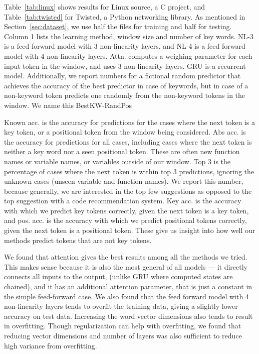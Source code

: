 \noindent
Table~\ref{tab:linux} shows results for Linux source, a C project, and
Table~\ref{tab:twisted} for Twisted, a Python networking library. As mentioned
in Section~\ref{sec:dataset}, we use half the files for training and half for
testing.
Column 1
lists the learning method, window size and number of key words.
NL-3 is a feed forward model with 3 non-linearity layers, and NL-4 is a feed
forward model with 4 non-linearity layers. Attn. computes a weighing
parameter for each input token in the window, and uses 3 non-linearity layers.
GRU is a recurrent model.
Additionally, we report numbers for a fictional random
predictor that achieves the accuracy of the best predictor in case of keywords,
but in case of a non-keyword token predicts one randomly from the non-keyword
tokens in the window. We name this BestKW-RandPos

Known acc. is the
accuracy for predictions for the cases where the next token is a key token, or
a positional token from the window being considered. Abs acc. is the accuracy
for predictions for all cases, including cases where the next token is
neither a key word nor a seen positional token. These are often new function
names or variable names, or variables outside of our window. Top 3 is the
percentage of cases where the next token is within top 3 predictions, ignoring
the unknown cases (unseen variable and function names).
We report this number, because generally, we are interested in the top few
suggestions as opposed to the top suggestion with a code recommendation system.
Key acc. is the
accuracy with which we predict key tokens correctly, given the next token is a
key token,
and pos. acc. is the accuracy with which we predict positional tokens
correctly, given the next token is a positional token.
These give us insight into how well our methods predict tokens that are not key
tokens.

We found that attention gives the best results among all the methods we tried.
This makes sense because it is also the most general of all models --- it
directly connects all inputs to the output, (unlike GRU where computed states
are chained), and it has an additional attention parameter, that is just a
constant in the simple feed-forward case. We also found that the feed forward
model with 4 non-linearity layers tends to overfit the training data, giving a slightly
lower accuracy on test data. Increasing the word vector dimensions also tends
to result in overfitting. Though regularization can help with overfitting, we
found that reducing vector dimensions and number of layers was also sufficient
to reduce high variance from overfitting.

